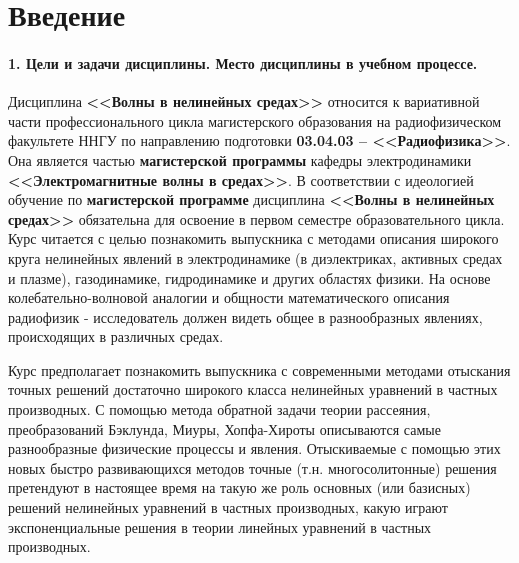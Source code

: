 \documentclass[a4paper]{article}
\begin{document}
\fontsize{14}{21pt}\selectfont
\section*{Введение}
\paragraph{\Large{1. Цели и задачи дисциплины. Место дисциплины в учебном процессе.}}

 Дисциплина \textbf{<<Волны в нелинейных средах>>} относится к вариативной части профессионального цикла магистерского образования на радиофизическом факультете ННГУ по направлению подготовки \textbf{03.04.03 -- <<Радиофизика>>}. Она является частью \textbf{магистерской программы} кафедры электродинамики \textbf{<<Электромагнитные волны в средах>>}. В соответствии с идеологией обучение по \textbf{магистерской программе} дисциплина \textbf{<<Волны в нелинейных средах>>} обязательна для освоение в первом семестре образовательного цикла. Курс читается с целью познакомить выпускника с методами описания широкого круга нелинейных явлений в электродинамике (в диэлектриках, активных средах и плазме), газодинамике, гидродинамике и других областях физики. На основе колебательно-волновой аналогии и общности математического описания радиофизик - исследователь должен видеть общее в разнообразных явлениях, происходящих в различных средах.
 
 Курс предполагает познакомить выпускника с современными методами отыскания точных решений достаточно широкого класса нелинейных уравнений в частных производных. С помощью метода обратной задачи теории рассеяния, преобразований Бэклунда, Миуры, Хопфа-Хироты описываются самые разнообразные физические процессы и явления. Отыскиваемые с помощью этих новых быстро развивающихся методов  точные (т.н. многосолитонные) решения претендуют в настоящее время на такую же роль основных (или базисных) решений нелинейных уравнений в частных производных, какую играют экспоненциальные решения в теории линейных уравнений в частных производных.
	
\end{document}
